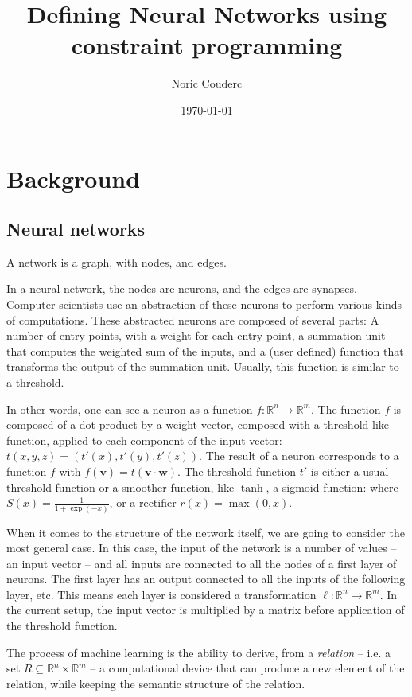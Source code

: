 \documentclass[a4paper, 10pt]{article}
\title{Defining Neural Networks using constraint programming}
\author{Noric Couderc}
\date{\today}
\begin{document}
\maketitle
\tableofcontents

\section{Background}

\subsection*{Neural networks}

A network is a graph, with nodes, and edges.

In a neural network, the nodes are neurons, and the edges are synapses. Computer
scientists use an abstraction of these neurons to perform  various kinds of
computations. These abstracted neurons are composed of several parts: A number
of entry points, with a weight for each entry point, a summation unit that
computes the weighted sum of the inputs, and a (user defined) function that
transforms the output of the summation unit.  Usually, this function is similar
to a threshold.

In other words, one can see a neuron as a function $f : \mathbb{R}^n \rightarrow
\mathbb{R}^m$.
The function $f$ is composed of a dot product by a weight vector, composed with a
threshold-like function, applied to each component of the input vector:
$t(x, y, z) = (t'(x), t'(y), t'(z))$. The result of a neuron corresponds to a 
function $f$ with $f(\mathbf{v}) = t(\mathbf{v} \cdot \mathbf{w})$.  The threshold function
$t'$ is either a usual threshold function or a smoother function, like $\tanh$,
a sigmoid function:  where $S(x) = \frac{1}{1 + \exp(-x)}$, or a rectifier 
$r(x) = \max(0, x)$.

When it comes to the structure of the network itself, we are going to consider
the most general case. In this case, the input of the network is a number of
values  -- an input vector -- and all inputs are connected to all the nodes of a
first layer of neurons. The first layer has an output connected to all the
inputs of the following layer, etc. This means each layer is considered a
transformation $\ell : \mathbb{R}^n \rightarrow \mathbb{R}^m$. In the current
setup, the input vector is multiplied by a matrix before application of the
threshold function. 

The process of machine learning is the ability to derive, from a \emph{relation}
-- i.e. a set $R \subseteq \mathbb{R}^n \times \mathbb{R}^m$ -- a computational
device that can produce a new element of the relation, while keeping the
semantic structure of the relation.  
\end{document}
